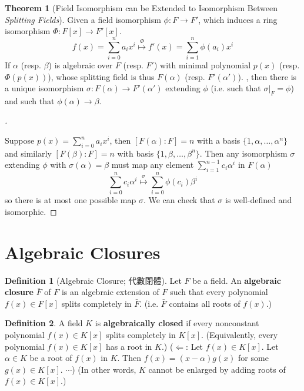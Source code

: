 \documentclass[12pt]{article}
\theoremstyle{definition}
\newtheorem{thm}{Theorem}
\newtheorem{dfn}{Definition}
\newenvironment{proofs}[1][\proofname]{%
  \begin{proof}[#1]$ $\par\nobreak\ignorespaces
}{%
  \end{proof}
}
\begin{document}
\begin{thm}[Field Isomorphism can be Extended to Isomorphism Between \textit{Splitting Fields}]\label{lift_splitting}
	Given a field isomorphism $\phi:F\to F'$, which induces a ring isomorphism $\Phi: F[x]\to F'[x]$.
	\[f(x)=\sum_{i=0}^n a_i x^i \overset{{\Phi}}{\mapsto} f'(x)=\sum_{i=1}^n \phi(a_i) x^i\]
	If $\alpha$ (resp. $\beta$) is algebraic over $F$ (resp. $F'$) with minimal polynomial $p(x)$ (resp. $\Phi(p(x))$), whose splitting field is thus $F(\alpha)$ (resp. $F'(\alpha')$).
	, then there is a unique isomorphism $\sigma: F(\alpha)\to F'(\alpha')$ extending $\phi$ (i.e. such that $\sigma|_F=\phi$) and such that $\phi(\alpha)\to\beta$.
\end{thm}

\begin{proofs}
	Suppose $p(x)=\sum_{i=0}^n a_i x^i$, then $[F(\alpha):F]=n$ with a basis $\{1,\alpha, \dots,\alpha^n\}$
	and similarly $[F(\beta):F]=n$ with basis $\{1,\beta,\dots,\beta^n\}$.
	Then any isomorphism $\sigma$ extending $\phi$ with $\sigma(\alpha)=\beta$ must map any element $\sum_{i=1}^{n-1} c_i \alpha^i$ in $F(\alpha)$
	\[\sum_{i=0}^n c_i \alpha^i \overset\sigma\mapsto \sum_{i=0}^n \phi(c_i) \beta^i \]
	so there is at most one possible map $\sigma$. We can check that $\sigma$ is well-defined and isomorphic.
\end{proofs}

\section{Algebraic Closures}

\begin{dfn}[Algebraic Closure; 代數閉體]
	Let $F$ be a field.
	An \textbf{algebraic closure} $\bar{F}$ of $F$ is an algebraic extension of $F$ such that every polynomial $f(x) \in F[x]$ splits completely in $\bar{F}$.
	(i.e. $\bar{F}$ contains all roots of $f(x)$.)
\end{dfn}

\begin{dfn}
	A field $K$ is \textbf{algebraically closed} if every nonconstant polynomial $f(x) \in K[x]$ splits completely in $K[x]$.
	(Equivalently, every polynomial $f(x) \in K[x]$ has a root in $K$.)
	($\Leftarrow$: Let $f(x) \in K[x]$.
	Let $\alpha \in K$ be a root of $f(x)$ in $K$.
	Then $f(x) = (x - \alpha) g(x)$ for some $g(x) \in K[x]$. $\cdots$)
	(In other words, $K$ cannot be enlarged by adding roots of $f(x) \in K[x]$.)
\end{dfn}
\end{document}
